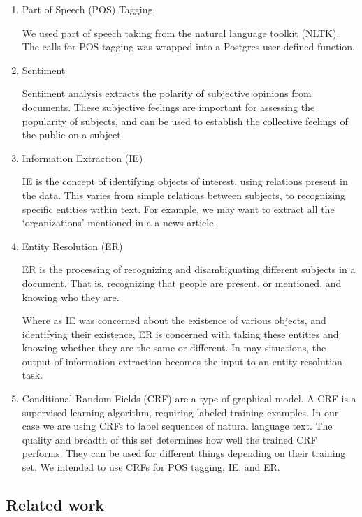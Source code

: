 \documentclass[11pt]{article}
\begin{document}
  \begin{enumerate}

  \item Part of Speech (POS) Tagging

	We used part of speech taking from the natural language toolkit (NLTK). 
	The calls for POS tagging was wrapped into a Postgres user-defined function.


  \item Sentiment

    Sentiment analysis extracts the polarity of subjective opinions from documents.
    These subjective feelings are important for assessing the popularity of subjects,
    and can be used to establish the collective feelings of the public on a subject.


  \item Information Extraction (IE) 

	IE is the concept of identifying objects of interest,
    using relations present in the data.
    This varies from simple relations between subjects,
    to recognizing specific entities within text.
		For example, we may want to extract all the `organizations' mentioned in a 
		a news article.


  \item Entity Resolution (ER) 
	
		ER is the processing of recognizing and disambiguating different subjects in a document.
    That is, recognizing that people are present,
    or mentioned, and knowing who they are.

    Where as IE was concerned about the existence of various objects,
    and identifying their existence,
    ER is concerned with taking these entities and knowing whether they are the same or different.
		In may situations, the output of information extraction becomes the input 
		to an entity resolution task.


  \item Conditional Random Fields (CRF) are a type of graphical model.
    A CRF is a supervised learning algorithm, requiring labeled training examples.
    In our case we are using CRFs to label sequences of natural language text.
    The quality and breadth of this set determines how well the trained CRF performs.
    They can be used for different things depending on their training set.
    We intended to use CRFs for POS tagging, IE, and ER.

     \end{enumerate}
  \subsection{Related work}
\end{document}
